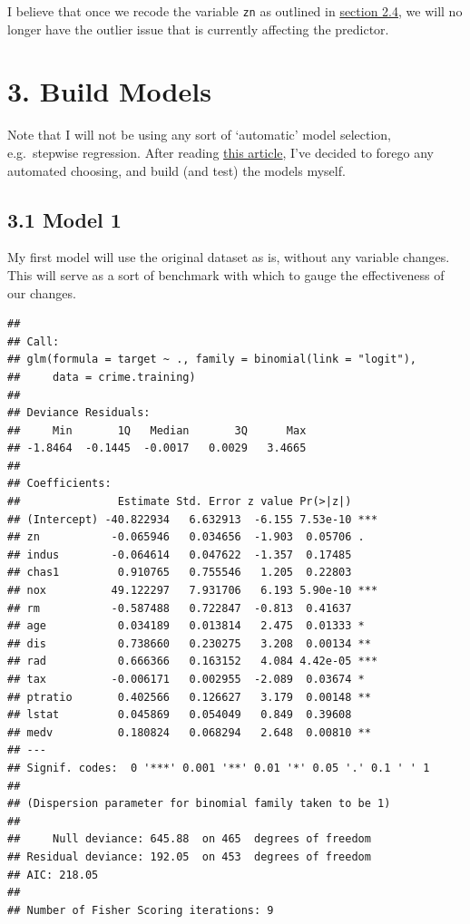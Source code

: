 \documentclass[]{article}
\begin{document}
I believe that once we recode the variable \texttt{zn} as outlined in
\protect\hyperlink{variable-transformation}{section 2.4}, we will no
longer have the outlier issue that is currently affecting the predictor.

\section{3. Build Models}\label{build-models}

Note that I will not be using any sort of `automatic' model selection,
e.g.~stepwise regression. After reading
\href{https://www.stata.com/support/faqs/statistics/stepwise-regression-problems/}{this
article}, I've decided to forego any automated choosing, and build (and
test) the models myself.

\subsection{3.1 Model 1}\label{model-1}

My first model will use the original dataset as is, without any variable
changes. This will serve as a sort of benchmark with which to gauge the
effectiveness of our changes.

\begin{verbatim}
## 
## Call:
## glm(formula = target ~ ., family = binomial(link = "logit"), 
##     data = crime.training)
## 
## Deviance Residuals: 
##     Min       1Q   Median       3Q      Max  
## -1.8464  -0.1445  -0.0017   0.0029   3.4665  
## 
## Coefficients:
##               Estimate Std. Error z value Pr(>|z|)    
## (Intercept) -40.822934   6.632913  -6.155 7.53e-10 ***
## zn           -0.065946   0.034656  -1.903  0.05706 .  
## indus        -0.064614   0.047622  -1.357  0.17485    
## chas1         0.910765   0.755546   1.205  0.22803    
## nox          49.122297   7.931706   6.193 5.90e-10 ***
## rm           -0.587488   0.722847  -0.813  0.41637    
## age           0.034189   0.013814   2.475  0.01333 *  
## dis           0.738660   0.230275   3.208  0.00134 ** 
## rad           0.666366   0.163152   4.084 4.42e-05 ***
## tax          -0.006171   0.002955  -2.089  0.03674 *  
## ptratio       0.402566   0.126627   3.179  0.00148 ** 
## lstat         0.045869   0.054049   0.849  0.39608    
## medv          0.180824   0.068294   2.648  0.00810 ** 
## ---
## Signif. codes:  0 '***' 0.001 '**' 0.01 '*' 0.05 '.' 0.1 ' ' 1
## 
## (Dispersion parameter for binomial family taken to be 1)
## 
##     Null deviance: 645.88  on 465  degrees of freedom
## Residual deviance: 192.05  on 453  degrees of freedom
## AIC: 218.05
## 
## Number of Fisher Scoring iterations: 9
\end{verbatim}
\end{document}
